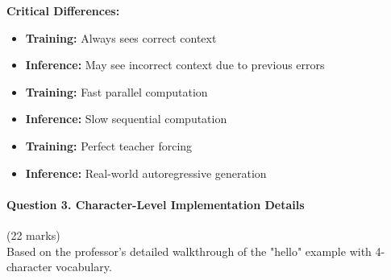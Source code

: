 \documentclass[12pt]{article}
\begin{document}
\begin{enumerate}[(a)]
{    \textbf{Critical Differences:}
    \begin{itemize}
        \item \textbf{Training:} Always sees correct context
        \item \textbf{Inference:} May see incorrect context due to previous errors
        \item \textbf{Training:} Fast parallel computation
        \item \textbf{Inference:} Slow sequential computation
        \item \textbf{Training:} Perfect teacher forcing
        \item \textbf{Inference:} Real-world autoregressive generation
    \end{itemize}
    }
\end{enumerate}

\newpage
\paragraph{Question 3. Character-Level Implementation Details}\hfill (22 marks)\\
Based on the professor's detailed walkthrough of the "hello" example with 4-character vocabulary.
\end{document}
